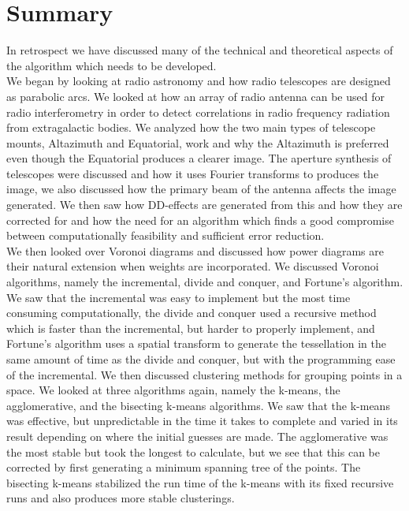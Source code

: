 \section{Summary}\label{sum}
In retrospect we have discussed many of the technical and theoretical aspects of the algorithm which needs to be developed.
\\
We began by looking at radio astronomy and how radio telescopes are designed as parabolic arcs. We looked at how an array of radio antenna can be used for radio interferometry in order to detect correlations in radio frequency radiation from extragalactic bodies. We analyzed how the two main types of telescope mounts, Altazimuth and Equatorial, work and why the Altazimuth is preferred even though the Equatorial produces a clearer image. The aperture synthesis of telescopes were discussed and how it uses Fourier transforms to produces the image, we also discussed how the primary beam of the antenna affects the image generated. We then saw how DD-effects are generated from this and how they are corrected for and how the need for an algorithm which finds a good compromise between computationally feasibility and sufficient error reduction.
\\
We then looked over Voronoi diagrams and discussed how power diagrams are their natural extension when weights are incorporated. We discussed Voronoi algorithms, namely the incremental, divide and conquer, and Fortune's algorithm. We saw that the incremental was easy to implement but the most time consuming computationally, the divide and conquer used a recursive method which is faster than the incremental, but harder to properly implement, and Fortune's algorithm uses a spatial transform to generate the tessellation in the same amount of time as the divide and conquer, but with the programming ease of the incremental. We then discussed clustering methods for grouping points in a space. We looked at three algorithms again, namely the k-means, the agglomerative, and the bisecting k-means algorithms. We saw that the k-means was effective, but unpredictable in the time it takes to complete and varied in its result depending on where the initial guesses are made. The agglomerative was the most stable but took the longest to calculate, but we see that this can be corrected by first generating a minimum spanning tree of the points. The bisecting k-means stabilized the run time of the k-means with its fixed recursive runs and also produces more stable clusterings.
\\

